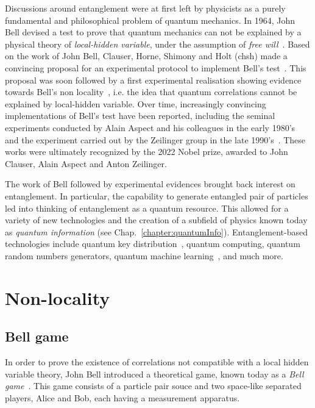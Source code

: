 \medbreak
Discussions around entanglement were at first left by physicists as a purely fundamental and philosophical problem of quantum mechanics.
In 1964, John Bell devised a test to prove that quantum mechanics can not be explained by a physical theory of \textit{local-hidden variable}, under the assumption of \textit{free will}~\cite{Bell1964}. 
Based on the work of John Bell, Clauser, Horne, Shimony and Holt (\acrshort{chsh}) made a convincing proposal for an experimental protocol to implement Bell's test~\cite{Clauser1969}. 
This proposal was soon followed by a first experimental realisation showing evidence towards Bell's non locality~\cite{Freedman1972}, i.e. the idea that quantum correlations cannot be explained by local-hidden variable.
Over time, increasingly convincing implementations of Bell's test have been reported, including the seminal experiments conducted by Alain Aspect and his colleagues in the early 1980's~\cite{Aspect1982,Aspect1982b} and the experiment carried out by the Zeilinger group in the late 1990's~\cite{Weihs1998}.
These works were ultimately recognized by the 2022 Nobel prize, awarded to John Clauser, Alain Aspect and Anton Zeilinger.

\medbreak
The work of Bell followed by experimental evidences brought back interest on entanglement.
In particular, the capability to generate entangled pair of particles led into thinking of entanglement as a quantum resource.
This allowed for a variety of new technologies and the creation of a subfield of physics known today as \textit{quantum information} (see Chap.~\ref{chapter:quantumInfo}).
Entanglement-based technologies include quantum key distribution~\cite{Ekert1991}, quantum computing, quantum random numbers generators, quantum machine learning~\cite{Biamonte2017}, and much more. 


\chapter{Non-locality}
\label{section:nonlocality}


\section{Bell game}

In order to prove the existence of correlations not compatible with a local hidden variable theory, John Bell introduced a theoretical game, known today as a \textit{Bell game}~\cite{Bell1964}.
This game consists of a particle pair souce and two space-like separated players, Alice and Bob, each having a measurement apparatus.

